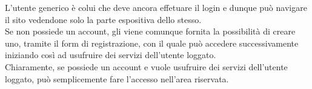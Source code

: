 L'utente generico è colui che deve ancora effetuare il login e dunque può navigare il sito vedendone solo la parte espositiva dello stesso.\\
Se non possiede un account, gli viene comunque fornita la possibilità di creare uno, tramite il form di registrazione, con il quale può accedere successivamente
iniziando così ad usufruire dei servizi dell'utente loggato.\\
Chiaramente, se possiede un account e vuole usufruire dei servizi dell'utente loggato,
può semplicemente fare l'accesso nell'area riservata. 